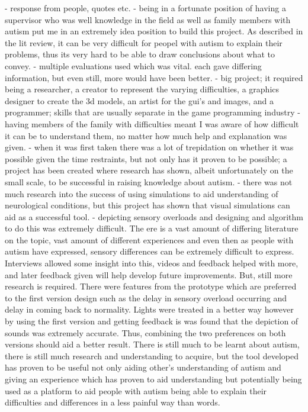 \documentclass[11pt]{report}
\begin{document}
- response from people, quotes etc. 
- being in a fortunate position of having a supervisor who was well knowledge in the field as well as family members with autism put me in an extremely idea position to build this project. As described in the lit review, it can be very difficult for peopel with autism to explain their problems, thus its very hard to be able to draw conclusions about what to convey.
- multiple evaluations used which was vital. each gave differing information, but even still, more would have been better. 
- big project; it required being a researcher, a creator to represent the varying difficulties, a graphics designer to create the 3d models, an artist for the gui's and images, and a programmer; skills that are usually separate in the game programming industry
- having members of the family with difficulties meant I was aware of how difficult it can be to understand them, no matter how much help and explanation was given. 
- when it was first taken there was a lot of trepidation on whether it was possible given the time restraints, but not only has it proven to be possible; a project has been created where research has shown, albeit unfortunately on the small scale, to be successful in raising knowledge about autism. 
- there was not much research into the success of using simulations to aid understanding of neurological conditions, but this project has shown that visual simulations can aid as a successful tool. 
- depicting sensory overloads and designing and algorithm to do this was extremely difficult. The ere is a vast amount of differing literature on the topic, vast amount of different experiences and even then as people with autism have expressed, sensory differences can be extremely difficult to express. Interviews allowed some insight into this, videos and feedback helped with more, and later feedback given will help develop future improvements. But, still more research is required. There were features from the prototype which are preferred to the first version design such as the delay in sensory overload occurring and delay in coming back to normality. Lights were treated in a better way however by using the first version and getting feedback is was found that the depiction of sounds was extremely accurate. Thus, combining the two preferences on both versions should aid a better result. 
There is still much to be learnt about autism, there is still much research and understanding to acquire, but the tool developed has proven to be useful not only aiding other's understanding of autism and giving an experience which has proven to aid understanding but potentially being used as a platform to aid people with autism being able to explain their difficulties and differences in a less painful way than words. 
\end{document}
